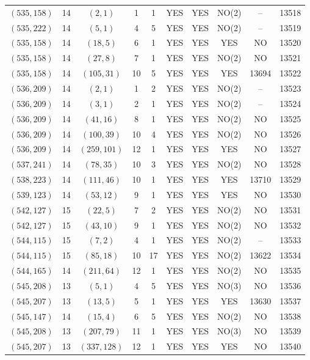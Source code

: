 \begin{longtable}{|c|c|c|c|c|c|c|c|c|c|}
$(535, 158)$ & 14 & $(2, 1)$ & 1 & 1 & YES & YES & NO(2) & -- & 13518\\
$(535, 222)$ & 14 & $(5, 1)$ & 4 & 5 & YES & YES & NO(2) & -- & 13519\\
$(535, 158)$ & 14 & $(18, 5)$ & 6 & 1 & YES & YES & YES & NO & 13520\\
$(535, 158)$ & 14 & $(27, 8)$ & 7 & 1 & YES & YES & NO(2) & NO & 13521\\
$(535, 158)$ & 14 & $(105, 31)$ & 10 & 5 & YES & YES & YES & 13694 & 13522\\
$(536, 209)$ & 14 & $(2, 1)$ & 1 & 2 & YES & YES & NO(2) & -- & 13523\\
$(536, 209)$ & 14 & $(3, 1)$ & 2 & 1 & YES & YES & NO(2) & -- & 13524\\
$(536, 209)$ & 14 & $(41, 16)$ & 8 & 1 & YES & YES & NO(2) & NO & 13525\\
$(536, 209)$ & 14 & $(100, 39)$ & 10 & 4 & YES & YES & NO(2) & NO & 13526\\
$(536, 209)$ & 14 & $(259, 101)$ & 12 & 1 & YES & YES & YES & NO & 13527\\
$(537, 241)$ & 14 & $(78, 35)$ & 10 & 3 & YES & YES & NO(2) & NO & 13528\\
$(538, 223)$ & 14 & $(111, 46)$ & 10 & 1 & YES & YES & YES & 13710 & 13529\\
$(539, 123)$ & 14 & $(53, 12)$ & 9 & 1 & YES & YES & YES & NO & 13530\\
$(542, 127)$ & 15 & $(22, 5)$ & 7 & 2 & YES & YES & NO(2) & NO & 13531\\
$(542, 127)$ & 15 & $(43, 10)$ & 9 & 1 & YES & YES & NO(2) & NO & 13532\\
$(544, 115)$ & 15 & $(7, 2)$ & 4 & 1 & YES & YES & NO(2) & -- & 13533\\
$(544, 115)$ & 15 & $(85, 18)$ & 10 & 17 & YES & YES & NO(2) & 13622 & 13534\\
$(544, 165)$ & 14 & $(211, 64)$ & 12 & 1 & YES & YES & NO(2) & NO & 13535\\
$(545, 208)$ & 13 & $(5, 1)$ & 4 & 5 & YES & YES & NO(3) & NO & 13536\\
$(545, 207)$ & 13 & $(13, 5)$ & 5 & 1 & YES & YES & YES & 13630 & 13537\\
$(545, 147)$ & 14 & $(15, 4)$ & 6 & 5 & YES & YES & NO(2) & NO & 13538\\
$(545, 208)$ & 13 & $(207, 79)$ & 11 & 1 & YES & YES & NO(3) & NO & 13539\\
$(545, 207)$ & 13 & $(337, 128)$ & 12 & 1 & YES & YES & YES & NO & 13540\\

\end{longtable}
